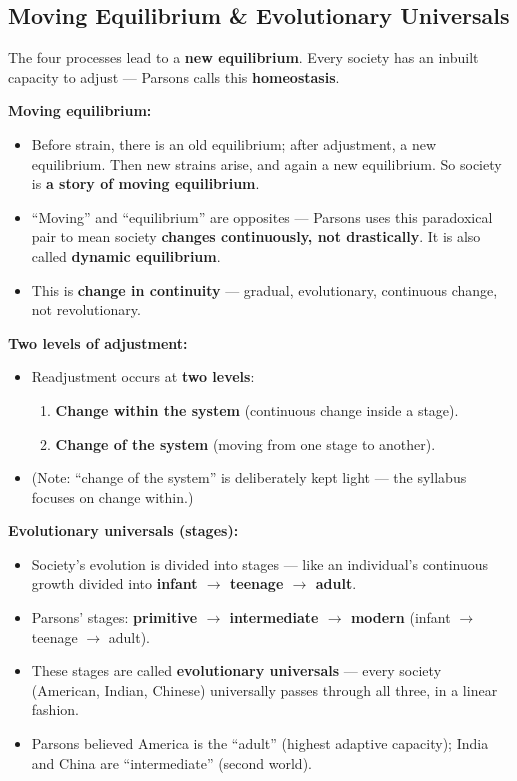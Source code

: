 \sectiondivider

\subsection{Moving Equilibrium \& Evolutionary Universals}

The four processes lead to a \textbf{new equilibrium}. Every society has an inbuilt capacity to adjust --- Parsons calls this \textbf{homeostasis}.

\begin{KeyConcept}
\textbf{Moving equilibrium:}
\begin{itemize}
\item Before strain, there is an old equilibrium; after adjustment, a new equilibrium. Then new strains arise, and again a new equilibrium. So society is \textbf{a story of moving equilibrium}.
\item ``Moving'' and ``equilibrium'' are opposites --- Parsons uses this paradoxical pair to mean society \textbf{changes continuously, not drastically}. It is also called \textbf{dynamic equilibrium}.
\item This is \textbf{change in continuity} --- gradual, evolutionary, continuous change, not revolutionary.
\end{itemize}
\end{KeyConcept}

\begin{KeyConcept}
\textbf{Two levels of adjustment:}
\begin{itemize}
\item Readjustment occurs at \textbf{two levels}:
\begin{enumerate}
\item \textbf{Change within the system} (continuous change inside a stage).
\item \textbf{Change of the system} (moving from one stage to another).
\end{enumerate}
\item (Note: ``change of the system'' is deliberately kept light --- the syllabus focuses on change within.)
\end{itemize}
\end{KeyConcept}

\begin{DataFact}
\textbf{Evolutionary universals (stages):}
\begin{itemize}
\item Society's evolution is divided into stages --- like an individual's continuous growth divided into \textbf{infant $\rightarrow$ teenage $\rightarrow$ adult}.
\item Parsons' stages: \textbf{primitive $\rightarrow$ intermediate $\rightarrow$ modern} (infant $\rightarrow$ teenage $\rightarrow$ adult).
\item These stages are called \textbf{evolutionary universals} --- every society (American, Indian, Chinese) universally passes through all three, in a linear fashion.
\item Parsons believed America is the ``adult'' (highest adaptive capacity); India and China are ``intermediate'' (second world).
\end{itemize}
\end{DataFact}

